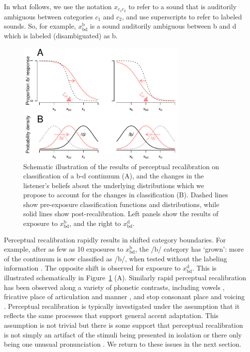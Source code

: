 In what follows, we use the notation $x_{c_1 c_2}$ to refer to a sound that is auditorily ambiguous between categories $c_1$ and $c_2$, and use superscripts to refer to labeled sounds.  So, for example, $x_\mathrm{bd}^\mathrm{b}$ is a sound auditorily ambiguous between \ph b and \ph d which is labeled (disambiguated) as \ph b.

\begin{figure}[htb]
  \centering
  \includegraphics[width=0.75\textwidth]{figs/belief-updating-recal-schematic.pdf}
  \caption{Schematic illustration of the results of perceptual recalibration on classification of a \ph b-\ph d continuum (A), and the changes in the listener's beliefs about the underlying distributions which we propose to account for the changes in classification (B).  Dashed lines show pre-exposure classification functions and distributions, while solid lines show post-recalibration.  Left panels show the results of exposure to $x_\mathrm{bd}^\mathrm{b}$, and the right to $x_\mathrm{bd}^\mathrm{d}$.}
  \label{fig:belief-updating-schematic}
\end{figure}

Perceptual recalibration rapidly results in shifted category boundaries. For example, after as few as 10 exposures to $x_\mathrm{bd}^\mathrm{b}$, the /b/ category has `grown': more of the continuum is now classified as /b/, when tested without the labeling information \cite{Vroomen2007}. The opposite shift is observed for exposure to $x_\mathrm{bd}^\mathrm{d}$. This is illustrated schematically in Figure~\ref{fig:belief-updating-schematic} (A). Similarly rapid perceptual recalibration has been observed along a variety of phonetic contrasts, including vowels \cite{Maye2008a}, fricative place of articulation and manner \cite{Kraljic2005,Norris2003}, and stop consonant place \cite{Bertelson2003} and voicing \cite{Kraljic2006}.  Perceptual recalibration is typically investigated under the assumption that it reflects the same processes that support general accent adaptation.  This assumption is not trivial but there is some support that perceptual recalibration is not simply an artifact of the stimuli being presented in isolation \cite{Eisner2006} or there only being one unusual pronunciation \cite{Reinisch2014}.  We return to these issues in the next section. %

